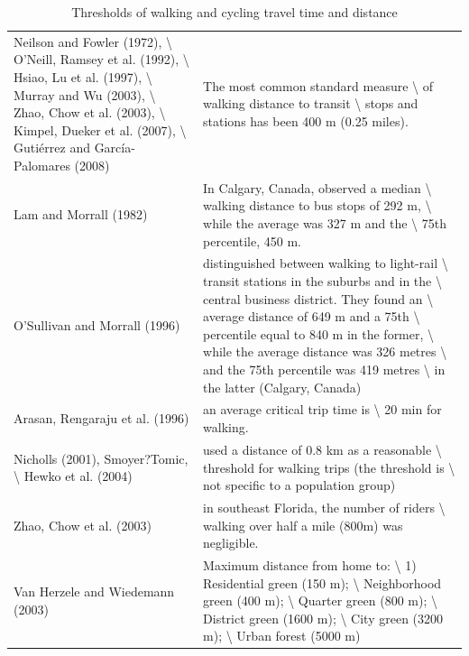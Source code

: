 \documentclass[
11pt, %
oneside, %
english, %
singlespacing, %
]{macthesis} %
\begin{document}
\begin{landscape}\begingroup\fontsize{12}{14}\selectfont

\begin{longtable}[t]{>{\raggedright\arraybackslash}p{9cm}>{\raggedright\arraybackslash}p{9cm}}
\caption{\label{tab:ch02-make-table-09}\label{tab:ch02-make-table-09}Thresholds of walking and cycling travel time and distance}\\
\toprule
\multicolumn{1}{>{\centering\arraybackslash}p{9cm}}{\textbf{Distance/Time thresholds}} & \multicolumn{1}{>{\centering\arraybackslash}p{9cm}}{\textbf{Description}}\\
\midrule
Neilson and Fowler (1972), \textbackslash{} O'Neill, Ramsey et al. (1992), \textbackslash{} Hsiao, Lu et al. (1997), \textbackslash{} Murray and Wu (2003), \textbackslash{} Zhao, Chow et al. (2003), \textbackslash{} Kimpel, Dueker et al. (2007), \textbackslash{} Gutiérrez and García-Palomares (2008) & The most common standard measure \textbackslash{} of walking distance to transit \textbackslash{} stops and stations has been 400 m (0.25 miles).\\
Lam and Morrall (1982) & In Calgary, Canada, observed a median \textbackslash{} walking distance to bus stops of 292 m, \textbackslash{} while the average was 327 m and the \textbackslash{} 75th percentile, 450 m.\\
O'Sullivan and Morrall (1996) & distinguished between walking to light-rail \textbackslash{} transit stations in the suburbs and in the \textbackslash{} central business district. They found an \textbackslash{} average distance of 649 m and a 75th \textbackslash{} percentile equal to 840 m in the former, \textbackslash{} while the average distance was 326 metres \textbackslash{} and the 75th percentile was 419 metres \textbackslash{} in the latter (Calgary, Canada)\\
Arasan, Rengaraju et al. (1996) & an average critical trip time is \textbackslash{} 20 min for walking.\\
Nicholls (2001), Smoyer?Tomic, \textbackslash{} Hewko et al. (2004) & used a distance of 0.8 km as a reasonable \textbackslash{} threshold for walking trips (the threshold is \textbackslash{} not specific to a population group)\\
\addlinespace
Zhao, Chow et al. (2003) & in southeast Florida, the number of riders \textbackslash{} walking over half a mile (800m) was negligible.\\
Van Herzele and Wiedemann (2003) & Maximum distance from home to: \textbackslash{} 1) Residential green (150 m); \textbackslash{} Neighborhood green (400 m); \textbackslash{} Quarter green (800 m); \textbackslash{} District green (1600 m); \textbackslash{} City green (3200 m); \textbackslash{} Urban forest (5000 m)\\

\end{longtable}
\end{landscape}
\end{document}
